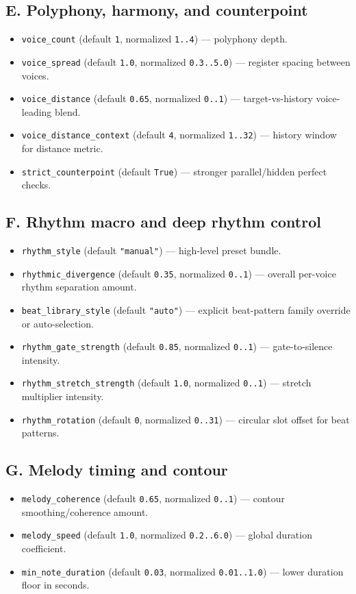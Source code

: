 \documentclass[11pt,a4paper]{article}
\begin{document}
\subsection*{E. Polyphony, harmony, and counterpoint}
\begin{itemize}
  \item \texttt{voice\_count} (default \texttt{1}, normalized \texttt{1..4}) --- polyphony depth.
  \item \texttt{voice\_spread} (default \texttt{1.0}, normalized \texttt{0.3..5.0}) --- register spacing between voices.
  \item \texttt{voice\_distance} (default \texttt{0.65}, normalized \texttt{0..1}) --- target-vs-history voice-leading blend.
  \item \texttt{voice\_distance\_context} (default \texttt{4}, normalized \texttt{1..32}) --- history window for distance metric.
  \item \texttt{strict\_counterpoint} (default \texttt{True}) --- stronger parallel/hidden perfect checks.
\end{itemize}

\subsection*{F. Rhythm macro and deep rhythm control}
\begin{itemize}
  \item \texttt{rhythm\_style} (default \texttt{"manual"}) --- high-level preset bundle.
  \item \texttt{rhythmic\_divergence} (default \texttt{0.35}, normalized \texttt{0..1}) --- overall per-voice rhythm separation amount.
  \item \texttt{beat\_library\_style} (default \texttt{"auto"}) --- explicit beat-pattern family override or auto-selection.
  \item \texttt{rhythm\_gate\_strength} (default \texttt{0.85}, normalized \texttt{0..1}) --- gate-to-silence intensity.
  \item \texttt{rhythm\_stretch\_strength} (default \texttt{1.0}, normalized \texttt{0..1}) --- stretch multiplier intensity.
  \item \texttt{rhythm\_rotation} (default \texttt{0}, normalized \texttt{0..31}) --- circular slot offset for beat patterns.
\end{itemize}

\subsection*{G. Melody timing and contour}
\begin{itemize}
  \item \texttt{melody\_coherence} (default \texttt{0.65}, normalized \texttt{0..1}) --- contour smoothing/coherence amount.
  \item \texttt{melody\_speed} (default \texttt{1.0}, normalized \texttt{0.2..6.0}) --- global duration coefficient.
  \item \texttt{min\_note\_duration} (default \texttt{0.03}, normalized \texttt{0.01..1.0}) --- lower duration floor in seconds.
\end{itemize}
\end{document}
